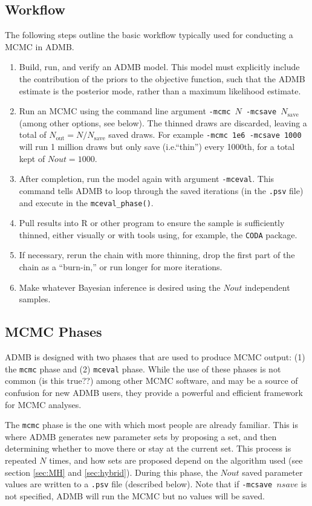 \documentclass{article}
\begin{document}
\subsection{Workflow}
The following steps outline the basic workflow typically
used for conducting a MCMC in ADMB.
\begin{enumerate}
\item Build, run, and verify an ADMB model. This model must
  explicitly include the contribution of the priors to the
  objective function, such that the ADMB estimate is the
  posterior mode, rather than a maximum likelihood estimate.
\item Run an MCMC using the command line argument
  \texttt{-mcmc $N$ -mcsave $N_{\text{save}}$} (among other
  options, see below). The thinned draws are discarded,
  leaving a total of $N_{\text{out}}=N/N_{\text{save}}$
  saved draws. For example \texttt{-mcmc 1e6 -mcsave 1000}
  will run 1 million draws but only save (i.e.``thin'')
  every 1000th, for a total kept of $Nout=1000$.
\item After completion, run the model again with argument
  \texttt{-mceval}. This command tells ADMB to loop through
  the saved iterations (in the \texttt{.psv} file) and
  execute in the \texttt{mceval\_phase()}.
\item Pull results into R or other program to ensure the
  sample is sufficiently thinned, either visually or with
  tools using, for example, the \texttt{CODA} package.
\item If necessary, rerun the chain with more thinning, drop
  the first part of the chain as a ``burn-in,'' or run
  longer for more iterations.
\item Make whatever Bayesian inference is desired using the
  $Nout$ independent samples.
\end{enumerate}

\subsection{MCMC Phases}
ADMB is designed with two phases that are used to produce
MCMC output: (1) the \texttt{mcmc} phase and (2)
\texttt{mceval} phase. While the use of these phases is not
common (is this true??) among other MCMC software, and may
be a source of confusion for new ADMB users, they provide a
powerful and efficient framework for MCMC analyses.

The \texttt{mcmc} phase is the one with which most people
are already familiar. This is where ADMB generates new
parameter sets by proposing a set, and then determining
whether to move there or stay at the current set. This
process is repeated $N$ times, and how sets are proposed
depend on the algorithm used (see section \ref{sec:MH} and
\ref{sec:hybrid}). During this phase, the $Nout$ saved
parameter values are written to a \texttt{.psv} file
(described below). Note that if \texttt{-mcsave $nsave$} is
not specified, ADMB will run the MCMC but no values will be
saved.
\end{document}
